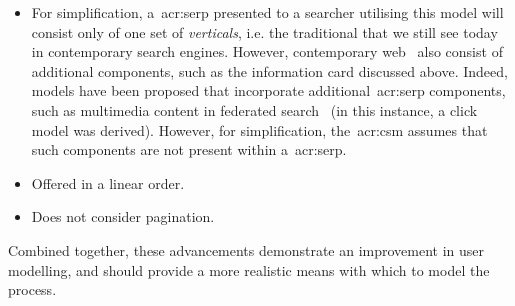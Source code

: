 \begin{itemize}
    \item{For simplification, a~\gls{acr:serp} presented to a searcher utilising this model will consist only of one set of \emph{verticals}, i.e. the traditional  that we still see today in contemporary search engines. However, contemporary web~ also consist of additional components, such as the information card discussed above. Indeed, models have been proposed that incorporate additional~\gls{acr:serp} components, such as multimedia content in federated search~\cite{chen2012federated_search_click_model} (in this instance, a click model was derived). However, for simplification, the~\gls{acr:csm} assumes that such components are not present within a~\gls{acr:serp}.}
    
    \item{Offered in a linear order.}
    
    \item{Does not consider pagination.}
    
\end{itemize}

Combined together, these advancements demonstrate an improvement in user modelling, and should provide a more realistic means with which to model the process.

